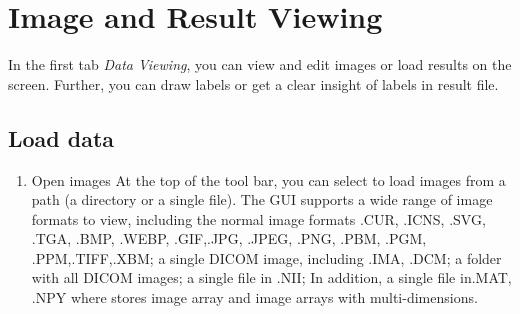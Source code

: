 \documentclass[12pt]{article}
\begin{document}
\graphicspath{ {images/} }
\section*{Image and Result Viewing}

In the first tab \textit{Data Viewing}, you can view and edit images or load results on the screen. Further, you can draw labels or get a clear insight of labels in result file.
\subsection{Load data}
\begin{enumerate}
	\item Open images
	\newline At the top of the tool bar, you can select to load images from a path (a directory or a single file). The GUI supports a wide range of image formats to view, including the normal image formats .CUR, .ICNS, .SVG, .TGA, .BMP, .WEBP, .GIF,.JPG, .JPEG, .PNG, .PBM, .PGM, .PPM,.TIFF,.XBM; a single DICOM image, including .IMA, .DCM; a folder with all DICOM images; a single file in .NII; In addition, a single file in.MAT, .NPY where stores image array                                                                                                                                                                                                                                                                               and image arrays with multi-dimensions.
	

\end{enumerate}
\end{document}
